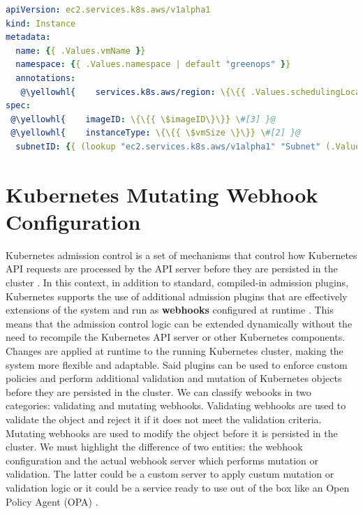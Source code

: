 \begin{lstlisting}[language=yaml, caption={AWS EC2 Instance Custom Resource}, label={lst:aws}]
apiVersion: ec2.services.k8s.aws/v1alpha1
kind: Instance
metadata:
  name: {{ .Values.vmName }}
  namespace: {{ .Values.namespace | default "greenops" }}
  annotations:
   @\yellowhl{    services.k8s.aws/region: \{\{{ .Values.schedulingLocation \}\}} \#[1] }@
spec:
 @\yellowhl{    imageID: \{\{{ \$imageID\}\}} \#[3] }@
 @\yellowhl{    instanceType: \{\{{ \$vmSize \}\}} \#[2] }@
  subnetID: {{ (lookup "ec2.services.k8s.aws/v1alpha1" "Subnet" (.Values.namespace | default "greenops") (printf "%s-subnet" .Values.vmName)).status.subnetID }}
\end{lstlisting}

\section{Kubernetes Mutating Webhook Configuration}

Kubernetes admission control is a set of mechanisms that control how Kubernetes API requests are processed by the API server before they are persisted in the cluster \cite{kubernetes_dynamic_admission_control}.
In this context, in addition to standard, compiled-in admission plugins, Kubernetes supports the use of additional admission plugins that are effectively extensions of the system and run as \textbf{webhooks} configured at runtime \cite{kubernetes_dynamic_admission_control}. 
This means that the admission control logic can be extended dynamically without the need to recompile the Kubernetes API server or other Kubernetes components. 
Changes are applied at runtime to the running Kubernetes cluster, making the system more flexible and adaptable.
Said plugins can be used to enforce custom policies and perform additional validation and mutation of Kubernetes objects before they are persisted in the cluster.
We can classify webooks in two categories: validating and mutating webhooks.
Validating webhooks are used to validate the object and reject it if it does not meet the validation criteria.
Mutating webhooks are used to modify the object before it is persisted in the cluster.
We must highlight the difference of two entities: the webhook configuration and the actual webhook server which performs mutation or validation.
The latter could be a custom server to apply custum mutation or validation logic or it could be a service ready to use out of the box like an Open Policy Agent (OPA) \cite{opa_docs}.

